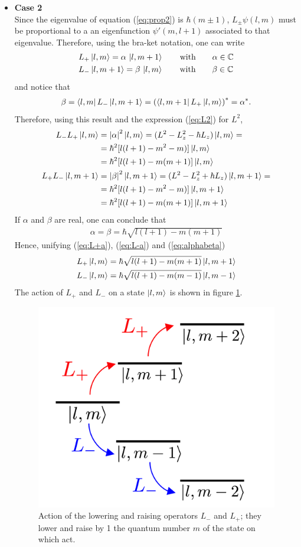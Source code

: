 \begin{itemize}
    \item \textbf{Case 2} \\
    Since the eigenvalue of equation (\ref{eq:prop2}) is $\hbar(m \pm 1)$, $L_\pm \psi (l,m)$ must be proportional to a an eigenfunction $\psi'(m,l+1)$ associated to that eigenvalue. Therefore, using the bra-ket notation, one can write
    \begin{align}
        & L_+ \ket{l,m} = \alpha \, \ket{l,m + 1} \qquad \text{with} \qquad \alpha \in \mathbb{C} \label{eq:L+a} \\
        & L_- \ket{l,m+1} = \beta \, \ket{l,m} \qquad \text{with} \qquad \beta \in \mathbb{C} \label{eq:L-a}
    \end{align}
    and notice that
    \begin{align*}
        \beta = \bra{l,m} L_- \ket{l,m+1} = \left( \bra{l,m+1} L_+ \ket{l,m} \right)^* = \alpha^*. 
    \end{align*}
    Therefore, using this result and the expression (\ref{eq:L2}) for $L^2$, 
    \begin{align*}
        L_- L_+ \ket{l,m} &= \abs{\alpha}^2 \ket{l,m} = (L^2 - L_z^2 - \hbar L_z) \ket{l,m} = \\
        & = \hbar^2 [l(l+1) - m^2 - m)] \ket{l,m} \\
        & = \hbar^2 [l(l+1) - m(m+1)] \ket{l,m} \\
        L_+ L_- \ket{l,m+1} &= \abs{\beta}^2 \ket{l,m+1} = (L^2 - L_z^2 + \hbar L_z) \ket{l,m+1} = \\
        & = \hbar^2 [l(l+1) - m^2 - m)] \ket{l,m+1} \\
        & = \hbar^2 [l(l+1) -m(m+1)] \ket{l,m+1} 
    \end{align*}
    If $\alpha$ and $\beta$ are real, one can conclude that 
    \begin{align}
        \alpha = \beta = \hbar \sqrt{l(l+1) - m(m+1)}
        \label{eq:alphabeta}
    \end{align}
    Hence, unifying (\ref{eq:L+a}), (\ref{eq:L-a}) and (\ref{eq:alphabeta})
    \begin{align}
        L_+ \ket{l,m} &=  \hbar \sqrt{l(l+1) - m(m+1)} \ket{l,m + 1} \label{eq:L+action}\\
        L_- \ket{l,m} &=  \hbar \sqrt{l(l+1) - m(m-1)} \ket{l,m -1} \label{eq:L-action}
    \end{align}
    The action of $L_+$ and $L_-$ on a state $\ket{l,m}$ is shown in figure \ref{fig:lowrai}. 
    \begin{figure}[h!]
\centering
    \includegraphics[width=0.35\linewidth]{images/Lowering_Raising_operators.png}
    \caption{Action of the lowering and raising operators $L_-$ and $L_+$; they lower and raise by 1 the quantum number $m$ of the state on which act.}
    \label{fig:lowrai}
\end{figure}
\end{itemize}
